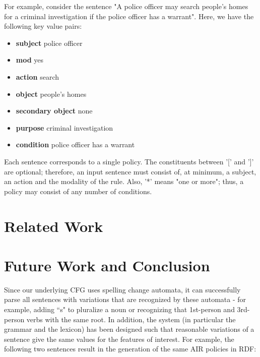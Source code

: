 \documentclass{llncs}
\begin{document}
For example, consider the sentence "A police officer may search people's homes for a criminal investigation if the police officer has a warrant". Here, we have the following key value pairs:

\begin{itemize}
\item \textbf{subject} police officer
\item \textbf{mod} yes
\item \textbf{action} search
\item \textbf{object} people's homes
\item \textbf{secondary object} none
\item \textbf{purpose} criminal investigation
\item \textbf{condition} police officer has a warrant
\end{itemize}

Each sentence corresponds to a single policy. The constituents between '[' and ']' are optional; therefore, an input sentence must consist of, at minimum, a subject, an action and the modality of the rule. Also, '*' means "one or more"; thus, a policy may consist of any number of conditions.


\section{Related Work}					\label{related}



\section{Future Work and Conclusion} \label{conclusion}

Since our underlying CFG uses spelling change automata, it can successfully parse all sentences with variations that are recognized by these automata - for example, adding ``s" to pluralize a noun or recognizing that 1st-person and 3rd-person verbs with the same root. In addition, the system (in particular the grammar and the lexicon) has been designed such that reasonable variations of a sentence give the same values for the features of interest. For example, the following two sentences result in the generation of the same AIR policies in RDF:
\end{document}
